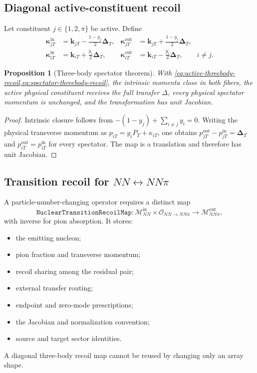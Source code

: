 \documentclass[11pt]{article}
\newtheorem{proposition}[definition]{Proposition}
\newcommand{\DT}{\bm{\Delta}_{T}}
\newcommand{\cO}{\mathcal O}
\newcommand{\cM}{\mathcal M}
\newcommand{\TransitionRecoil}{\texttt{NuclearTransitionRecoilMap}}
\begin{document}
\subsection{Diagonal active-constituent recoil}

Let constituent \(j\in\{1,2,\pi\}\) be active.  Define
\begin{align}
 \bm\kappa_{jT}^{\mathrm{in}}
 &=\bm k_{jT}-\frac{1-y_j}{2}\DT,
 &
 \bm\kappa_{jT}^{\mathrm{out}}
 &=\bm k_{jT}+\frac{1-y_j}{2}\DT,
 \label{eq:active-threebody-recoil}\\
 \bm\kappa_{iT}^{\mathrm{in}}
 &=\bm k_{iT}+\frac{y_i}{2}\DT,
 &
 \bm\kappa_{iT}^{\mathrm{out}}
 &=\bm k_{iT}-\frac{y_i}{2}\DT,
 \qquad i\neq j.
 \label{eq:spectator-threebody-recoil}
\end{align}

\begin{proposition}[Three-body spectator theorem]
With \cref{eq:active-threebody-recoil,eq:spectator-threebody-recoil}, the
intrinsic momenta close in both fibers, the active physical constituent
receives the full transfer \(\Delta\), every physical spectator momentum is
unchanged, and the transformation has unit Jacobian.
\end{proposition}

\begin{proof}
Intrinsic closure follows from
\(
-(1-y_j)+\sum_{i\neq j}y_i=0
\).
Writing the physical transverse momentum as
\(
 p_{iT}=y_iP_T+\kappa_{iT}
\), one obtains
\(
 p_{jT}^{\mathrm{out}}-p_{jT}^{\mathrm{in}}=\DT
\)
and
\(
 p_{iT}^{\mathrm{out}}=p_{iT}^{\mathrm{in}}
\)
for every spectator.  The map is a translation and therefore has unit
Jacobian.
\end{proof}

\subsection{Transition recoil for \texorpdfstring{\(NN\leftrightarrow NN\pi\)}{NN to NNpi}}

A particle-number-changing operator requires a distinct map
\begin{equation}
 \TransitionRecoil:
 \cM_{NN}^{\mathrm{in}}
 \times
 \cO_{NN\to NN\pi}
 \longrightarrow
 \cM_{NN\pi}^{\mathrm{out}},
 \label{eq:transition-recoil-map}
\end{equation}
with inverse for pion absorption.  It stores:
\begin{itemize}
\item the emitting nucleon;
\item pion fraction and transverse momentum;
\item recoil sharing among the residual pair;
\item external transfer routing;
\item endpoint and zero-mode prescriptions;
\item the Jacobian and normalization convention;
\item source and target sector identities.
\end{itemize}
A diagonal three-body recoil map cannot be reused by changing only an array
shape.
\end{document}

